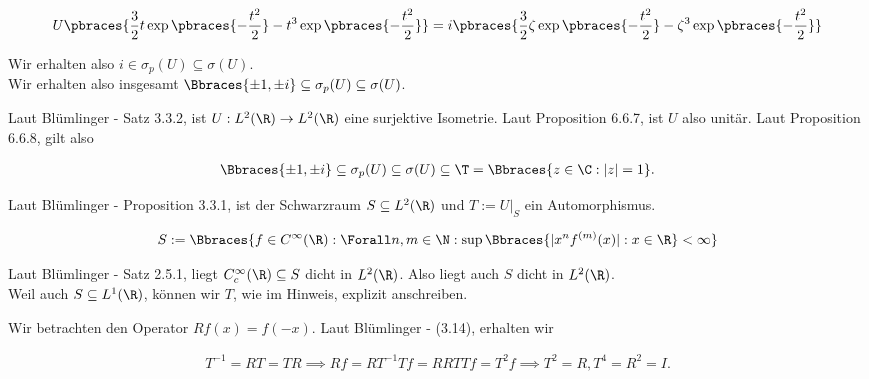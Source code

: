 \begin{solution}
\begin{align*}
  U \pbraces
  {
    \frac{3}{2}
    t \exp \pbraces{-\frac{t^2}{2}} -
    t^3 \exp \pbraces{-\frac{t^2}{2}}
  }
  =
  i \pbraces
  {
    \frac{3}{2} \zeta \exp \pbraces{-\frac{t^2}{2}} -
    \zeta^3 \exp \pbraces{-\frac{t^2}{2}}
  }
\end{align*}

Wir erhalten also $i \in \sigma_p(U) \subseteq \sigma(U)$. \\
Wir erhalten also insgesamt $\Bbraces{\pm 1, \pm i} \subseteq \sigma_p(U) \subseteq \sigma(U)$.


Laut Blümlinger - Satz 3.3.2, ist $U: L^2(\R) \to L^2(\R)$ eine surjektive Isometrie.
Laut Proposition 6.6.7, ist $U$ also unitär.
Laut Proposition 6.6.8, gilt also

\begin{align*}
  \Bbraces{\pm 1, \pm i}
  \subseteq
  \sigma_p(U)
  \subseteq
  \sigma(U)
  \subseteq
  \T
  =
  \Bbraces{z \in \C: |z| = 1}.
\end{align*}


Laut Blümlinger - Proposition 3.3.1, ist der Schwarzraum $S \subseteq L^2(\R)$ und $T := U|_S$ ein Automorphismus.

\begin{align*}
  S
  :=
  \Bbraces
  {
    f \in C^\infty(\R):
    \Forall n, m \in \N:
    \sup \Bbraces{|x^n f^{(m)}(x)| : x \in \R} < \infty
  }
\end{align*}


Laut Blümlinger - Satz 2.5.1, liegt $C_c^\infty(\R) \subseteq S$ dicht in $L^2(\R)$.
Also liegt auch $S$ dicht in $L^2(\R)$. \\

Weil auch $S \subseteq L^1(\R)$, können wir $T$, wie im Hinweis, explizit anschreiben. \\


Wir betrachten den Operator $R f(x) = f(-x)$.
Laut Blümlinger - (3.14), erhalten wir

\begin{align*}
  T^{-1} = R T = T R
  \implies
  R f = R T^{-1} T f = R R T T f = T^2 f
  \implies
  T^2 = R, T^4 = R^2 = I.
\end{align*}


\end{solution}
